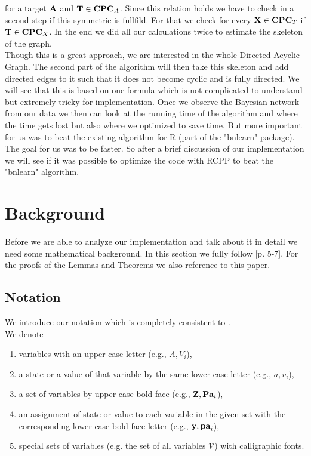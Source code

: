 for a target ${\textbf{A}}$ and ${\textbf{T}} \in {\textbf{CPC}}_{A}$. Since this relation holds we have to check in a second step if this symmetrie is fullfild. For that we check for every ${\textbf{X}} \in {\textbf{CPC}}_{T}$ if ${\textbf{T}} \in {\textbf{CPC}}_{X}$. In the end we did all our calculations twice to estimate the skeleton of the graph.\\
Though this is a great approach, we are interested in the whole Directed Acyclic Graph. The second part of the algorithm will then take this skeleton and add directed edges to it such that it does not become cyclic and is fully directed. We will see that this is based on one formula which is not complicated to understand but extremely tricky for implementation. Once we observe the Bayesian network from our data we then can look at the running time of the algorithm and where the time gets lost but also where we optimized to save time. But more important for us was to beat the existing algorithm for R (part of the "bnlearn" package). The goal for us was to be faster. So after a brief discussion of our implementation we will see if it was possible to optimize the code with RCPP to beat the "bnlearn" algorithm.

\chapter{Background}

Before we are able to analyze our implementation and talk about it in detail we need some mathematical background. In this section we fully follow \cite{TBA}[p. 5-7]. For the proofs of the Lemmas and Theorems we also reference to this paper.

	\section{Notation}

		We introduce our notation which is completely consistent to \cite{TBA}.\\
		We denote
		\begin{enumerate}
			\item variables with an upper-case letter (e.g., $A, V_{i}$),
			\item a state or a value of that variable by the same lower-case letter (e.g., $a, v_{i}$),
			\item a set of variables by upper-case bold face (e.g., ${\textbf{Z}}, {\textbf{Pa}}_{i}$),
			\item an assignment of state or value to each variable in the given set with the corresponding lower-case bold-face letter (e.g., ${\textbf{y}}, {\textbf{pa}}_{i}$),
			\item special sets of variables (e.g. the set of all variables $\mathcal{V}$) with calligraphic fonts.
		\end{enumerate}

